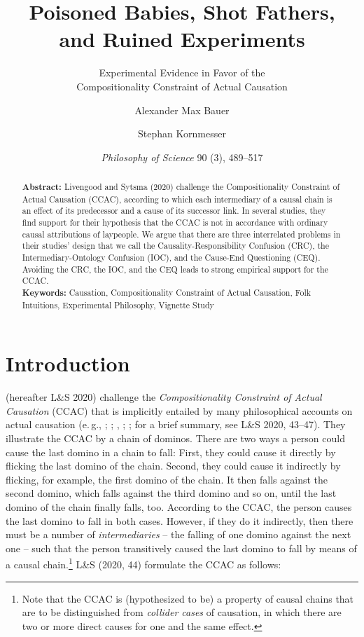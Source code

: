\documentclass[egregdoesnotlikesansseriftitles,12pt]{scrartcl}
\title{Poisoned Babies, Shot Fathers,\\and Ruined Experiments}
\subtitle{Experimental Evidence in Favor of the\\Compositionality Constraint of Actual Causation}
\author[1*]{Alexander Max Bauer}
\author[1]{Stephan Kornmesser}
\affil[1]{ Department of Philosophy, University of Oldenburg}
\affil[*]{ Corresponding Author, E-Mail: \href{mailto:alexander.max.bauer@uni-oldenburg.de}{alexander.max.bauer@uni-oldenburg.de}}
\date{\small \textit{Philosophy of Science} 90 (3), 489--517}
\begin{document}
\maketitle

\begin{abstract}
   \noindent\textbf{Abstract:} Livengood and Sytsma (2020) challenge the Compositionality Constraint of Actual Causation (CCAC), according to which each intermediary of a causal chain is an effect of its predecessor and a cause of its successor link. In several studies, they find support for their hypothesis that the CCAC is not in accordance with ordinary causal attributions of laypeople. We argue that there are three interrelated problems in their studies’ design that we call the Causality-Responsibility Confusion (CRC), the Intermediary-Ontology Confusion (IOC), and the Cause-End Questioning (CEQ). Avoiding the CRC, the IOC, and the CEQ leads to strong empirical support for the CCAC.\\[2ex]
   \textbf{Keywords:} Causation, Compositionality Constraint of Actual Causation, Folk Intuitions, Experimental Philosophy, Vignette Study\\[2ex]
\end{abstract}

\clearpage
\section{Introduction}\label{sec:introduction}
\citet{livengood_actual_2020} (hereafter L\&S 2020) challenge the \textit{Compositionality Constraint of Actual Causation} (CCAC) that is implicitly entailed by many philosophical accounts on actual causation (e.\,g., \cite{reichenbach_direction_1956}; \cite{salmon_causality_1994}; \cite{dowe_causality_1995}, \cite{ehring_causation_1997}; \cite{lewis_causation_1973,lewis_postscripts_1986}; for a brief summary, see L\&S 2020, 43--47). They illustrate the CCAC by a chain of dominos. There are two ways a person could cause the last domino in a chain to fall: First, they could cause it directly by flicking the last domino of the chain. Second, they could cause it indirectly by flicking, for example, the first domino of the chain. It then falls against the second domino, which falls against the third domino and so on, until the last domino of the chain finally falls, too. According to the CCAC, the person causes the last domino to fall in both cases. However, if they do it indirectly, then there must be a number of \textit{intermediaries} -- the falling of one domino against the next one -- such that the person transitively caused the last domino to fall by means of a causal chain.\footnote{Note that the CCAC is (hypothesized to be) a property of causal chains that are to be distinguished from \textit{collider cases} of causation, in which there are two or more direct causes for one and the same effect.} L\&S (2020, 44) formulate the CCAC as follows:
\end{document}
